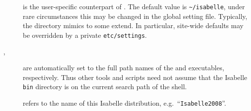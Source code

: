 \begin{isabellebody}
\begin{isamarkuptext}
\begin{description}
  \item[\hypertarget{setting.ISABELLE-HOME-USER}{\hyperlink{setting.ISABELLE-HOME-USER}{\mbox{}}}] is the user-specific
  counterpart of \hyperlink{setting.ISABELLE-HOME}{\mbox{}}. The default value is
  \verb|~/isabelle|, under rare circumstances this may be
  changed in the global setting file.  Typically, the \hyperlink{setting.ISABELLE-HOME-USER}{\mbox{}} directory mimics \hyperlink{setting.ISABELLE-HOME}{\mbox{}} to
  some extend. In particular, site-wide defaults may be overridden by
  a private \verb|etc/settings|.
  
  \item[\hypertarget{setting.ISABELLE}{\hyperlink{setting.ISABELLE}{\mbox{}}}\isa{{\isachardoublequote}\isactrlsup {\isacharasterisk}{\isachardoublequote}}, \hyperlink{setting.ISATOOL}{\mbox{}}\isa{{\isachardoublequote}\isactrlsup {\isacharasterisk}{\isachardoublequote}}] are automatically set to the full path
  names of the \hyperlink{executable.isabelle-process}{\mbox{}} and \hyperlink{executable.isatool}{\mbox{}} executables, respectively.  Thus other tools and scripts
  need not assume that the Isabelle \verb|bin| directory is on
  the current search path of the shell.
  
  \item[\hypertarget{setting.ISABELLE-IDENTIFIER}{\hyperlink{setting.ISABELLE-IDENTIFIER}{\mbox{}}}\isa{{\isachardoublequote}\isactrlsup {\isacharasterisk}{\isachardoublequote}}] refers
  to the name of this Isabelle distribution, e.g.\ ``\verb|Isabelle2008|''.


\end{description}
\end{isamarkuptext}
\end{isabellebody}

